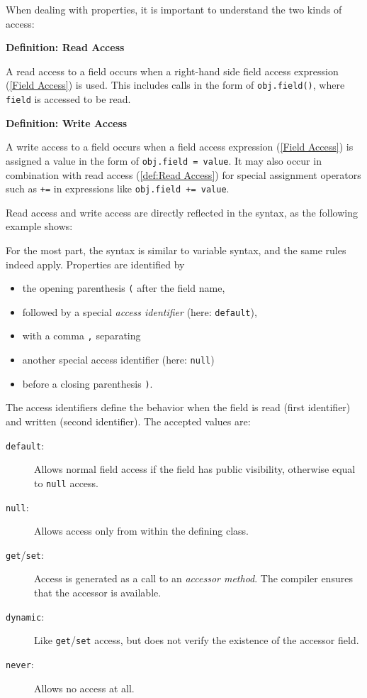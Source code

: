 \documentclass{article}
\newcommand{\expr}[1]{\texttt{#1}}
\newenvironment{myshaded}
  {\def\FrameCommand{\fboxsep=\topsep\colorbox{bgcolor}}%
  \MakeFramed {\advance\hsize-\width \FrameRestore}}%
 {\endMakeFramed}
\newcommand{\define}[3][Definition]
	{\begin{myshaded}\noindent\textbf{#1: #2}\par\nobreak\noindent\ignorespaces#3\label{def:#2}\end{myshaded}}
\newcommand{\tref}[2]{#1 (\ref{#2})}
\begin{document}
When dealing with properties, it is important to understand the two kinds of access:

\define{Read Access}{A read access to a field occurs when a right-hand side \tref{field access expression}{Field Access} is used. This includes calls in the form of \expr{obj.field()}, where \expr{field} is accessed to be read.}

\define{Write Access}{A write access to a field occurs when a \tref{field access expression}{Field Access} is assigned a value in the form of \expr{obj.field = value}. It may also occur in combination with \tref{read access}{def:Read Access} for special assignment operators such as \expr{+=} in expressions like \expr{obj.field += value}.} 

Read access and write access are directly reflected in the syntax, as the following example shows:



For the most part, the syntax is similar to variable syntax, and the same rules indeed apply. Properties are identified by

\begin{itemize}
	\item the opening parenthesis \expr{(} after the field name,
	\item followed by a special \emph{access identifier} (here: \expr{default}),
	\item with a comma \expr{,} separating
	\item another special access identifier (here: \expr{null})
	\item before a closing parenthesis \expr{)}.
\end{itemize}

The access identifiers define the behavior when the field is read (first identifier) and written (second identifier). The accepted values are:

\begin{description}
	\item[\expr{default}:] Allows normal field access if the field has public visibility, otherwise equal to \expr{null} access.
	\item[\expr{null}:] Allows access only from within the defining class.
	\item[\expr{get}/\expr{set}:] Access is generated as a call to an \emph{accessor method}. The compiler ensures that the accessor is available.
	\item[\expr{dynamic}:] Like \expr{get}/\expr{set} access, but does not verify the existence of the accessor field.
	\item[\expr{never}:] Allows no access at all.
\end{description}
\end{document}
